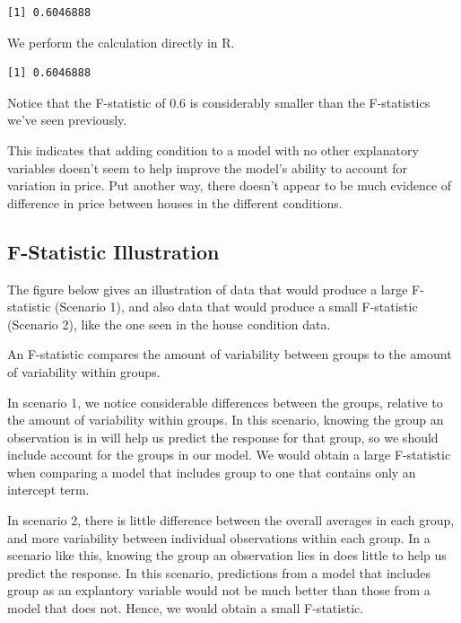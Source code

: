\documentclass[
  letterpaper,
  DIV=11,
  numbers=noendperiod]{scrreprt}
\newenvironment{Shaded}{\begin{snugshade}}{\end{snugshade}}
\newcommand{\DecValTok}[1]{\textcolor[rgb]{0.68,0.00,0.00}{#1}}
\newcommand{\FunctionTok}[1]{\textcolor[rgb]{0.28,0.35,0.67}{#1}}
\newcommand{\NormalTok}[1]{\textcolor[rgb]{0.00,0.23,0.31}{#1}}
\newcommand{\SpecialCharTok}[1]{\textcolor[rgb]{0.37,0.37,0.37}{#1}}
\begin{document}
\begin{verbatim}
[1] 0.6046888
\end{verbatim}

We perform the calculation directly in R.

\begin{Shaded}
\end{Shaded}

\begin{verbatim}
[1] 0.6046888
\end{verbatim}

Notice that the F-statistic of 0.6 is considerably smaller than the
F-statistics we've seen previously.

This indicates that adding condition to a model with no other
explanatory variables doesn't seem to help improve the model's ability
to account for variation in price. Put another way, there doesn't appear
to be much evidence of difference in price between houses in the
different conditions.

\subsection{F-Statistic Illustration}\label{f-statistic-illustration}

The figure below gives an illustration of data that would produce a
large F-statistic (Scenario 1), and also data that would produce a small
F-statistic (Scenario 2), like the one seen in the house condition data.

An F-statistic compares the amount of variability between groups to the
amount of variability within groups.

In scenario 1, we notice considerable differences between the groups,
relative to the amount of variability within groups. In this scenario,
knowing the group an observation is in will help us predict the response
for that group, so we should include account for the groups in our
model. We would obtain a large F-statistic when comparing a model that
includes group to one that contains only an intercept term.

In scenario 2, there is little difference between the overall averages
in each group, and more variability between individual observations
within each group. In a scenario like this, knowing the group an
observation lies in does little to help us predict the response. In this
scenario, predictions from a model that includes group as an explantory
variable would not be much better than those from a model that does not.
Hence, we would obtain a small F-statistic.
\end{document}
